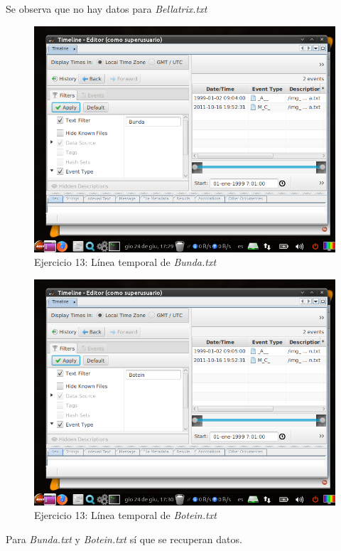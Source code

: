 \documentclass[11pt]{article}
\begin{document}
Se observa que no hay datos para \textit{Bellatrix.txt}

\begin{figure}[H]
    \caption{Ejercicio 13: Línea temporal de \textit{Bunda.txt}}
    \centering
    \includegraphics[scale=0.7]{e13-9.png}
\end{figure}

\begin{figure}[H]
    \caption{Ejercicio 13: Línea temporal de \textit{Botein.txt}}
    \centering
    \includegraphics[scale=0.7]{e13-10.png}
\end{figure}

Para \textit{Bunda.txt} y \textit{Botein.txt} sí que se recuperan datos.
\end{document}
